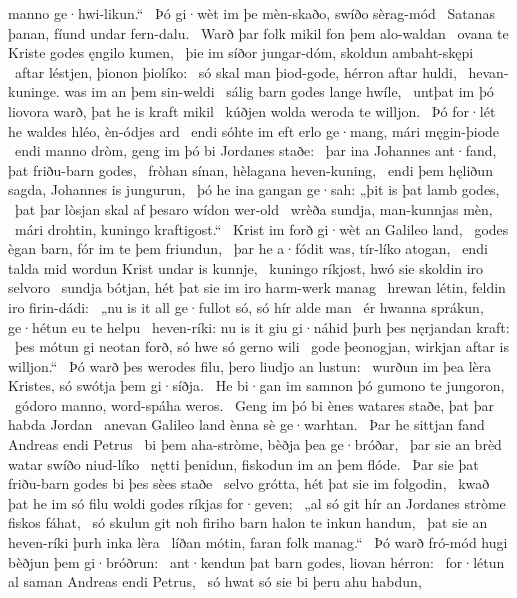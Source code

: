 manno ge·hwi-likun.“ \hld\ Þó gi·wèt im þe mèn-skaðo,
swíðo sèrag-mód \hld\ Satanas þanan,
fíund undar fern-dalu. \hld\ Warð þar folk mikil
fon þem alo-waldan \hld\ ovana te Kriste
godes ęngilo kumen, \hld\ þie im síðor jungar-dóm,
skoldun ambaht-skępi \hld\ aftar léstjen,
þionon þiolíko: \hld\ só skal man þiod-gode,
hérron aftar huldi, \hld\ hevan-kuninge.
was im an þem sin-weldi \hld\ sálig barn godes
lange hwíle, \hld\ untþat im þó liovora warð,
þat he is kraft mikil \hld\ kúðjen wolda
weroda te willjon. \hld\ Þó for·lét he waldes hléo,
èn-ódjes ard \hld\ endi sóhte im eft erlo ge·mang,
mári męgin-þiode \hld\ endi manno dròm,
geng im þó bi Jordanes staðe: \hld\ þar ina Johannes ant·fand,
þat friðu-barn godes, \hld\ fròhan sínan,
hèlagana heven-kuning, \hld\ endi þem hęliðun sagda,
Johannes is jungurun, \hld\ þó he ina gangan ge·sah:
„þit is þat lamb godes, \hld\ þat þar lòsjan skal
af þesaro wídon wer-old \hld\ wrèða sundja,
man-kunnjas mèn, \hld\ mári drohtin,
kuningo kraftigost.“ \hld\ Krist im forð gi·wèt
an Galileo land, \hld\ godes ègan barn,
fór im te þem friundun, \hld\ þar he a·fódit was,
tír-líko atogan, \hld\ endi talda mid wordun
Krist undar is kunnje, \hld\ kuningo ríkjost,
hwó sie skoldin iro selvoro \hld\ sundja bótjan,
hét þat sie im iro harm-werk manag \hld\ hrewan létin,
feldin iro firin-dádi: \hld\ „nu is it all ge·fullot só,
só hír alde man \hld\ ér hwanna sprákun,
ge·hétun eu te helpu \hld\ heven-ríki:
nu is it giu gi·náhid þurh þes nęrjandan kraft: \hld\ þes mótun gi neotan forð,
só hwe só gerno wili \hld\ gode þeonogjan,
wirkjan aftar is willjon.“ \hld\ Þó warð þes werodes filu,
þero liudjo an lustun: \hld\ wurðun im þea lèra Kristes,
só swótja þem gi·síðja. \hld\ He bi·gan im samnon þó
gumono te jungoron, \hld\ gódoro manno,
word-spáha weros. \hld\ Geng im þó bi ènes watares staðe,
þat þar habda Jordan \hld\ anevan Galileo land
ènna sè ge·warhtan. \hld\ Þar he sittjan fand
Andreas endi Petrus \hld\ bi þem aha-stròme,
bèðja þea ge·bróðar, \hld\ þar sie an brèd watar
swíðo niud-líko \hld\ nętti þenidun,
fiskodun im an þem flóde. \hld\ Þar sie þat friðu-barn godes
bi þes sèes staðe \hld\ selvo grótta,
hét þat sie im folgodin, \hld\ kwað þat he im só filu woldi
godes ríkjas for·geven; \hld\ „al só git hír an Jordanes stròme
fiskos fáhat, \hld\ só skulun git noh firiho barn
halon te inkun handun, \hld\ þat sie an heven-ríki
þurh inka lèra \hld\ líðan mótin,
faran folk manag.“ \hld\ Þó warð fró-mód hugi
bèðjun þem gi·bróðrun: \hld\ ant·kendun þat barn godes,
liovan hérron: \hld\ for·létun al saman
Andreas endi Petrus, \hld\ só hwat só sie bi þeru ahu habdun,
